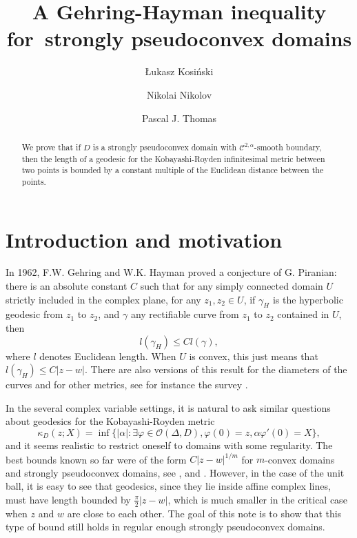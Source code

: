 \documentclass[a4paper,12pt]{amsart}
\title[Gehring-Hayman for strongly pseudoconvex domains]{A Gehring-Hayman inequality for~strongly pseudoconvex domains}
\author[\L ukasz Kosi\'nski]{\L ukasz Kosi\'nski}
\author{Nikolai Nikolov}
\author{Pascal J. Thomas}
\def\D{\Delta}
\def\k{\kappa}
\def\vp{\varphi}
\theoremstyle{remark}\newtheorem{remark}[theorem]{Remark}
\begin{document}
	
	
\begin{abstract}
We prove that if $D$ is a strongly pseudoconvex domain with $\mathcal C^{2, \alpha}$-smooth boundary, then the length of a geodesic for the Kobayashi-Royden infinitesimal metric between two points is bounded by a constant multiple of the Euclidean distance between the points.
\end{abstract}

	\maketitle

\section{Introduction and motivation}

In 1962, F.W. Gehring and W.K. Hayman \cite{GH} proved a conjecture of G. Piranian: 
there is an absolute constant $C$ such that for   any
simply connected domain $U$ strictly included in the complex plane, for any $z_1, z_2 \in U$,
if $\gamma_H$ is the hyperbolic geodesic from $z_1$ to $z_2$, and $\gamma$ any
rectifiable curve from $z_1$ to $z_2$ contained in $U$, then
\[
l\left( \gamma_H \right) \le C l\left( \gamma\right) ,
\]
where $l$ denotes Euclidean length. When $U$ is convex, this just means that
$l\left( \gamma_H \right) \le C |z-w|$. There are also versions of this 
result for the diameters of the curves and for other metrics, see for instance the survey \cite{PS}.

In the several complex variable settings, it is natural to ask similar questions
about geodesics for the Kobayashi-Royden metric
$$\k_D(z;X)=\inf\{|\alpha|:\exists\vp\in\mathcal O(\D,D), \vp(0)=z, \alpha\vp'(0)=X\},$$
 and it seems
realistic to restrict oneself to domains with some regularity. 
The best bounds known so far were of the form $C|z-w|^{1/m}$ for 
$m$-convex domains and strongly pseudoconvex domains, see \cite{LWZ}, \cite{LPW} and \cite{NO}.
However, in the case of the unit ball, it is easy to see that geodesics,
since they lie inside affine complex lines, must have length bounded by 
$\frac\pi2|z-w|$, which is much smaller in the critical case when $z$ and $w$
are close to each other.  The goal of this note is to show that this type of bound
still holds in regular enough strongly pseudoconvex domains.
\end{document}
